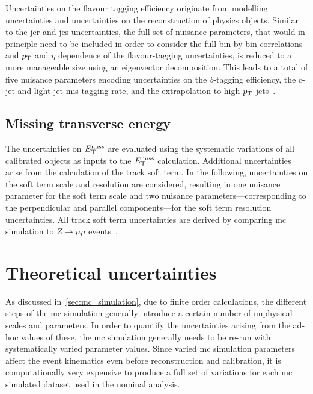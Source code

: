  Uncertainties on the flavour tagging efficiency originate from modelling uncertainties and uncertainties on the reconstruction of physics objects.
 Similar to the \gls{jer} and \gls{jes} uncertainties, the full set of nuisance parameters, that would in principle need to be included in order to consider the full bin-by-bin correlations and $p_{\mathrm{T}}$ and $\eta$ dependence of the flavour-tagging uncertainties, is reduced to a more manageable size using an eigenvector decomposition.
 This leads to a total of five nuisance parameters encoding uncertainties on the \textit{b}-tagging efficiency, the c-jet and light-jet mis-tagging rate, and the extrapolation to high-$p_{\mathrm{T}}$ jets~\cite{FTAG-2018-01, PERF-2016-05}.  
 
\subsection{Missing transverse energy}

The uncertainties on $E_{\textrm{T}}^{\textrm{miss}}$ are evaluated using the systematic variations of all calibrated objects as inputs to the $E_{\textrm{T}}^{\textrm{miss}}$ calculation.
Additional uncertainties arise from the calculation of the track soft term.
In the following, uncertainties on the soft term scale and resolution are considered, resulting in one nuisance parameter for the soft term scale and two nuisance parameters---corresponding to the perpendicular and parallel components---for the soft term resolution uncertainties.
All track soft term uncertainties are derived by comparing \gls{mc} simulation to $Z\rightarrow\mu\mu$ events~\cite{PERF-2016-07}. 

\section{Theoretical uncertainties}

As discussed in~\cref{sec:mc_simulation}, due to finite order calculations, the different steps of the \gls{mc} simulation generally introduce a certain number of unphysical scales and parameters.
In order to quantify the uncertainties arising from the ad-hoc values of these, the \gls{mc} simulation generally needs to be re-run with systematically varied parameter values.
Since varied \gls{mc} simulation parameters affect the event kinematics even before reconstruction and calibration, it is computationally very expensive to produce a full set of variations for each \gls{mc} simulated dataset used in the nominal analysis.

